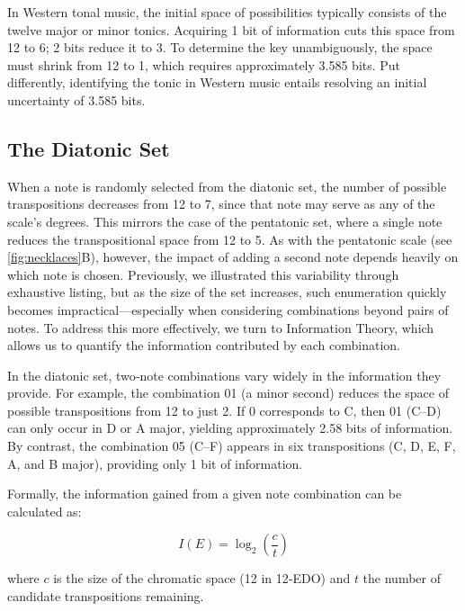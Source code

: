 \documentclass[10pt,twocolumn]{article}
\numberwithin{equation}{section} %
\begin{document}
    In Western tonal music, the initial space of possibilities typically consists of the twelve major or minor tonics.
    Acquiring 1 bit of information cuts this space from 12 to 6; 2 bits reduce it to 3.
    To determine the key unambiguously, the space must shrink from 12 to 1, which requires approximately 3.585 bits.
    Put differently, identifying the tonic in Western music entails resolving an initial uncertainty of 3.585 bits.

    \subsection{The Diatonic Set}

    When a note is randomly selected from the diatonic set, the number of possible transpositions decreases from 12 to 7, since that note may serve as any of the scale's degrees.
    This mirrors the case of the pentatonic set, where a single note reduces the transpositional space from 12 to 5.
    As with the pentatonic scale (see \autoref{fig:necklaces}B), however, the impact of adding a second note depends heavily on which note is chosen.
    Previously, we illustrated this variability through exhaustive listing, but as the size of the set increases, such enumeration quickly becomes impractical—especially when considering combinations beyond pairs of notes.
    To address this more effectively, we turn to Information Theory, which allows us to quantify the information contributed by each combination.

    In the diatonic set, two‑note combinations vary widely in the information they provide.
    For example, the combination 01 (a minor second) reduces the space of possible transpositions from 12 to just 2.
    If 0 corresponds to C, then 01 (C–D\text{$\flat$}) can only occur in D\text{$\flat$} or A\text{$\flat$} major, yielding approximately 2.58 bits of information.
    By contrast, the combination 05 (C–F) appears in six transpositions (C, D\text{$\flat$}, E\text{$\flat$}, F, A\text{$\flat$}, and B\text{$\flat$} major), providing only 1 bit of information.

    Formally, the information gained from a given note combination can be calculated as:

    \begin{equation}
        I(E) = \log_{2} \left( \frac{c}{t} \right)
        \label{eq:derivingSelfInformation}
    \end{equation}

    where $c$ is the size of the chromatic space (12 in 12‑EDO) and $t$ the number of candidate transpositions remaining.
\end{document}
